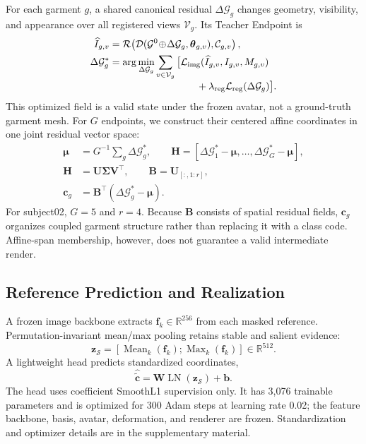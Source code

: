 \documentclass[letterpaper]{article}
\begin{document}
For each garment $g$, a shared canonical residual $\Delta\mathcal{G}_g$ changes geometry, visibility, and appearance over all registered views $\mathcal{V}_g$. Its Teacher Endpoint is
\begin{equation}
\begin{aligned}
\widehat I_{g,v}&=\mathcal R\!\left(
\mathcal D(\mathcal G^0\!\oplus\!\Delta\mathcal G_g,\boldsymbol\theta_{g,v}),
\mathcal C_{g,v}\right),\\
\Delta\mathcal G_g^*&=\arg\min_{\Delta\mathcal G_g}
\sum_{v\in\mathcal V_g}\big[
\mathcal L_{\mathrm{img}}(\widehat I_{g,v},I_{g,v},M_{g,v})\\[-1mm]
&\hspace{31mm}+\lambda_{\mathrm{reg}}
\mathcal L_{\mathrm{reg}}(\Delta\mathcal G_g)\big].
\end{aligned}
\label{eq:teacher}
\end{equation}
This optimized field is a valid state under the frozen avatar, not a ground-truth garment mesh. For $G$ endpoints, we construct their centered affine coordinates in one joint residual vector space:
\begin{align}
\boldsymbol{\mu}&=G^{-1}\textstyle\sum_g\Delta\mathcal G_g^*,\qquad
\mathbf H=[\Delta\mathcal G_1^*-\boldsymbol\mu,\ldots,\Delta\mathcal G_G^*-\boldsymbol\mu],\nonumber\\
\mathbf H&=\mathbf U\boldsymbol\Sigma\mathbf V^\top,\qquad
\mathbf B=\mathbf U_{[:,1:r]},\nonumber\\
\mathbf c_g&=\mathbf B^\top(\Delta\mathcal G_g^*-\boldsymbol\mu).
\label{eq:basis}
\end{align}
For subject02, $G=5$ and $r=4$. Because $\mathbf{B}$ consists of spatial residual fields, $\mathbf{c}_g$ organizes coupled garment structure rather than replacing it with a class code. Affine-span membership, however, does not guarantee a valid intermediate render.

\subsection{Reference Prediction and Realization}

A frozen image backbone extracts $\mathbf{f}_k\in\mathbb{R}^{256}$ from each masked reference. Permutation-invariant mean/max pooling retains stable and salient evidence:
\begin{equation}
\mathbf{z}_{\mathcal S}=[\operatorname{Mean}_{k}(\mathbf f_k);\operatorname{Max}_{k}(\mathbf f_k)]\in\mathbb{R}^{512}.
\label{eq:aggregation}
\end{equation}
A lightweight head predicts standardized coordinates,
\begin{equation}
\widehat{\widetilde{\mathbf c}}=\mathbf W\operatorname{LN}(\mathbf z_{\mathcal S})+\mathbf b.
\label{eq:predictor}
\end{equation}
The head uses coefficient SmoothL1 supervision only. It has 3,076 trainable parameters and is optimized for 300 Adam steps at learning rate 0.02; the feature backbone, basis, avatar, deformation, and renderer are frozen. Standardization and optimizer details are in the supplementary material.
\end{document}
